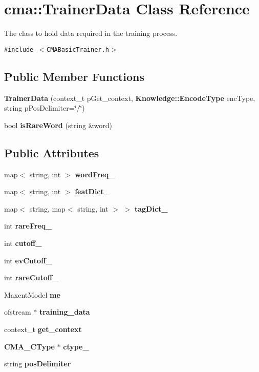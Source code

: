 \section{cma::TrainerData Class Reference}
\label{classcma_1_1TrainerData}
The class to hold data required in the training process.  


{\tt \#include $<$CMABasicTrainer.h$>$}

\subsection*{Public Member Functions}
\begin{CompactItemize}
\item 
\textbf{TrainerData} (context\_\-t pGet\_\-context, {\bf Knowledge::EncodeType} encType, string pPosDelimiter=\char`\"{}/\char`\"{})\label{classcma_1_1TrainerData_52479f4d8dfb9764cc59b226c06658da}

\item 
bool \textbf{isRareWord} (string \&word)\label{classcma_1_1TrainerData_309417a7099ac688be954c81a9c98742}

\end{CompactItemize}
\subsection*{Public Attributes}
\begin{CompactItemize}
\item 
map$<$ string, int $>$ \textbf{wordFreq\_\-}\label{classcma_1_1TrainerData_1d9d4c16f23c5885d8dfa8c4989be181}

\item 
map$<$ string, int $>$ \textbf{featDict\_\-}\label{classcma_1_1TrainerData_565db4b9101b4c17c9a6f8530a19d2f6}

\item 
map$<$ string, map$<$ string, int $>$ $>$ \textbf{tagDict\_\-}\label{classcma_1_1TrainerData_9ecba8810e62c9a6bfb7446264654a28}

\item 
int {\bf rareFreq\_\-}
\item 
int {\bf cutoff\_\-}
\item 
int {\bf evCutoff\_\-}
\item 
int \textbf{rareCutoff\_\-}\label{classcma_1_1TrainerData_29cc800fcc110731293ef351c7a7bfdf}

\item 
MaxentModel {\bf me}
\item 
ofstream $\ast$ \textbf{training\_\-data}\label{classcma_1_1TrainerData_beca151a5af14873ecd25be4ff926d24}

\item 
context\_\-t {\bf get\_\-context}
\item 
{\bf CMA\_\-CType} $\ast$ \textbf{ctype\_\-}\label{classcma_1_1TrainerData_a415bd191302d39887f15f1511392ab3}

\item 
string \textbf{posDelimiter}\label{classcma_1_1TrainerData_24b6c6f09b1ffe2c5228730901147224}

\end{CompactItemize}


